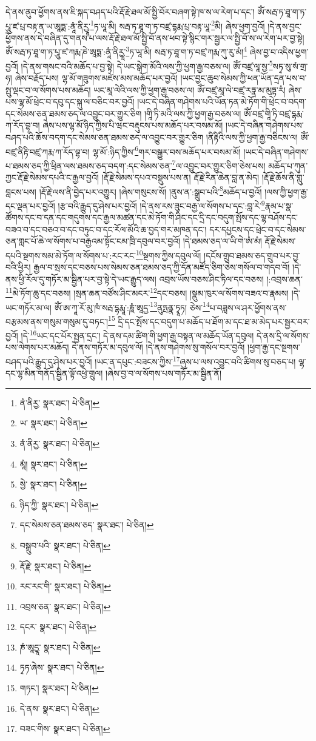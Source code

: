 དེ་ནས་ནུབ་ཕྱོགས་ནས་ཇི་སྐད་བཤད་པའི་རྡོ་རྗེ་ཐལ་མོ་སྤྱི་བོར་བཞག་སྟེ་ཁ་ས་ལ་རེག་པ་དང་། ཨོཾ་སརྦ་ཏ་ཐཱ་ག་ཏ་པཱུ་ཛ་པྲ་བརྟ་ན་ཡ་ཨཱཏྨ་:ནཱཾ་ནིརྱཱ་\footnote{ནཾ་ནིརྱ་  སྣར་ཐང་།  པེ་ཅིན། }ཏ་ཡཱ་མི། སརྦ་ཏ་ཐཱ་ག་ཏ་བཛྲ་དྷརྨ་པྲ་བརྟ་ཡཱ་\footnote{ཡ་  སྣར་ཐང་།  པེ་ཅིན། }མི། ཞེས་ཕྱག་བྱའོ། །དེ་ནས་བྱང་ཕྱོགས་ནས་དེ་བཞིན་དུ་གནས་པ་ལས་རྡོ་རྗེ་ཐལ་མོ་སྤྱི་བོ་ནས་ཕབ་སྟེ་སྙིང་གར་སྦྱར་ལ་སྤྱི་བོ་ས་ལ་རེག་པར་བྱ་སྟེ། ཨོཾ་སརྦ་ཏ་ཐཱ་ག་ཏ་པཱུ་ཛ་ཀརྨ་ཎེ་ཨཱཏྨ་:ནཱཾ་ནིརྱཱ་\footnote{ནཾ་ནིརྱ་  སྣར་ཐང་།  པེ་ཅིན། }ཏ་ཡཱ་མི། སརྦ་ཏ་ཐཱ་ག་ཏ་བཛྲ་ཀརྨ་ཀུ་རུ་མཾ།\footnote{མཱཾ།  སྣར་ཐང་།  པེ་ཅིན། } ཞེས་བྱ་བ་འདིས་ཕྱག་བྱའོ། །དེ་ནས་གསང་བའི་མཆོད་པ་བྱ་སྟེ། དེ་ཡང་སྒེག་མོའི་ལས་ཀྱི་ཕྱག་རྒྱ་བཅས་ལ། ཨོཾ་བཛྲ་ལཱ་སྱ་\footnote{སྱེ་  སྣར་ཐང་།  པེ་ཅིན། }སཏྭ་སུ་སཾ་གྲ་ཧ། ཞེས་བརྗོད་པས། ལྷ་མོ་གཟུགས་མཛེས་མས་མཆོད་པར་བྱའོ། །ཡང་བྱང་ཆུབ་སེམས་ཀྱི་ཕན་ཡོན་དྲན་པས་བ་སྤུ་ལྡང་བ་ལ་སོགས་པས་མཆོད། ཡང་མཱ་ལེའི་ལས་ཀྱི་ཕྱག་རྒྱ་བཅས་ལ། ཨོཾ་བཛྲ་མཱ་ལེ་བཛྲ་རཏྣ་མ་མུཏྟ་རཾ། ཞེས་པས་ལྷ་མོ་ཕྲེང་བ་དབུ་དང་སྐུ་ལ་བཅིང་བར་བྱའོ། །ཡང་དེ་བཞིན་གཤེགས་པའི་ཡོན་ཏན་མེ་ཏོག་གི་ཕྲེང་བ་བདག་དང་སེམས་ཅན་ཐམས་ཅད་ལ་འབྱུང་བར་གྱུར་ཅིག །གཱི་ཏི་མའི་ལས་ཀྱི་ཕྱག་རྒྱ་བཅས་ལ། ཨོཾ་བཛྲ་གཱི་ཏི་བཛྲ་དྷརྨ་ཀ་རོད་བྷ་བ། ཞེས་པས་ལྷ་མོ་ཉིད་ཀྱིས་པི་ཝང་བརྡུངས་པས་མཆོད་པར་བསམ་མོ། །ཡང་དེ་བཞིན་གཤེགས་པས་བཤད་པའི་ཆོས་བདག་དང་སེམས་ཅན་ཐམས་ཅད་ལ་འབྱུང་བར་གྱུར་ཅིག །ནིརྟིའི་ལས་ཀྱི་ཕྱག་རྒྱ་བཅིངས་ལ། ཨོཾ་བཛྲ་ནིརྟི་བཛྲ་ཀརྨ་ཀ་རོད་བྷ་བ། ལྷ་མོ་:ཉིད་ཀྱིས་\footnote{ཉིད་ཀྱི་  སྣར་ཐང་།  པེ་ཅིན། }གར་བསྒྱུར་བས་མཆོད་པར་བསམ་མོ། །ཡང་དེ་བཞིན་གཤེགས་པ་ཐམས་ཅད་ཀྱི་ཕྲིན་ལས་ཐམས་ཅད་བདག་:དང་སེམས་ཅན་\footnote{དང་སེམས་ཅན་ཐམས་ཅད་  སྣར་ཐང་།  པེ་ཅིན། }ལ་འབྱུང་བར་གྱུར་ཅིག་ཅེས་པས། མཆོད་པ་ཀུན་ཀྱང་རྡོ་རྗེ་སེམས་དཔའི་ང་རྒྱལ་བྱའོ། །རྡོ་རྗེ་སེམས་དཔའ་བསྡུས་པས་ན། རྡོ་རྗེ་རིན་ཆེན་བླ་ན་མེད། །རྡོ་རྗེ་ཆོས་ནི་གླུ་བླངས་པས། །རྡོ་རྗེ་ལས་ནི་བྱེད་པར་འགྱུར། །ཞེས་གསུངས་སོ། །ནུས་ན་:སྒྲུབ་པའི་\footnote{བསྒྲུབ་པའི་  སྣར་ཐང་།  པེ་ཅིན། }མཆོད་པ་བྱའོ། །ལས་ཀྱི་ཕྱག་རྒྱ་དང་ལྡན་པར་བྱའོ། །རྩ་བའི་རྒྱུད་དུ་ཤེས་པར་བྱའོ། །དེ་ནས་རས་ཟུང་བརྒྱ་ལ་སོགས་པ་དང་:བླ་རེ་\footnote{རྡོ་རྗེ་  སྣར་ཐང་།  པེ་ཅིན། }རྣམ་པ་སྣ་ཚོགས་དང་བ་དན་དང་གདུགས་དང་རྒྱལ་མཚན་དང་མེ་ཏོག་གི་ཤིང་དང་དྲི་དང་བདུག་སྤོས་དང་ལྷ་བཤོས་དང་བཟའ་བ་དང་བཅའ་བ་དང་བཏུང་བ་དང་རོལ་མོའི་ཆ་བྱད་གར་མཁན་དང་། དར་དཔྱངས་དང་ཕྲེང་བ་དང་སེམས་ཅན་གླང་པོ་ཆེ་ལ་སོགས་པ་བརྒྱའམ་སྟོང་ངམ་ཁྲི་དབུལ་བར་བྱའོ། །དེ་ཐམས་ཅད་ལ་ཡི་གེ་ཨཾ་མཾ། རྡོ་རྗེ་སེམས་དཔའི་སྔགས་སམ་མེ་ཏོག་ལ་སོགས་པ་:རང་རང་\footnote{རང་རང་གི་  སྣར་ཐང་།  པེ་ཅིན། }སྔགས་ཀྱིས་དབུལ་ལོ། །དངོས་གྲུབ་ཐམས་ཅད་གྲུབ་པར་བྱ་བའི་ཕྱིར། རྒྱལ་བ་སྲས་དང་བཅས་པས་སེམས་ཅན་ཐམས་ཅད་ཀྱི་དོན་མཛོད་ཅིག་ཅེས་གསོལ་བ་གདབ་བོ། །དེ་ནས་ཕྱི་རོལ་དུ་གཏོར་མ་སྦྱིན་པར་བྱ་སྟེ་དེ་ཡང་རྒྱུད་ལས། འབྲས་ཡོས་བཅས་ཤིང་ཏིལ་དང་བཅས། །:འབྲས་ཆན་\footnote{འབྲས་ཅན་  སྣར་ཐང་།  པེ་ཅིན། }མེ་ཏོག་ཆུ་དང་བཅས། །སྲན་ཆན་བཙོས་ཤིང་མངར་\footnote{དངར་  སྣར་ཐང་།  པེ་ཅིན། }དང་བཅས། །སྣུམ་ཁུར་ལ་སོགས་བཟའ་བ་རྣམས། །དེ་ཡང་གཏོར་མ་ལ། ཨོཾ་ཨ་ཀཱ་རོ་མུ་ཁཾ་སརྦ་དྷརྨཱ་:ཎཱཾ་ཨཱདྱ་\footnote{ཎཾ་ཨཱདྱཱ་  སྣར་ཐང་།  པེ་ཅིན། }ནུཏྤནྣ་ཏྭཱཏ། ཅེས་\footnote{ཏྭཏ་ཞེས་  སྣར་ཐང་།  པེ་ཅིན། }པ་བཟླས་ལ་ཤར་ཕྱོགས་ནས་བརྩམས་ནས་གསུམ་གསུམ་དུ་བཏང་།\footnote{གཏང་།  སྣར་ཐང་།  པེ་ཅིན། } དྲི་དང་སྤོས་དང་བདུག་པ་མཆོད་པ་ཐོག་མ་དང་ཐ་མ་མེད་པར་སྦྱར་བར་བྱའོ། །དེ་\footnote{དེ་ནས་  སྣར་ཐང་།  པེ་ཅིན། }ཡང་དང་པོར་སྤྱན་དྲང་། དེ་ནས་དམ་ཚིག་གི་ཕྱག་རྒྱ་བསྟན་ལ་མཆོད་ཡོན་དབུལ། དེ་ནས་དྲི་ལ་སོགས་པས་ལེགས་པར་མཆོད། དེ་ནས་གཏོར་མ་དབུལ་ལོ། །དེ་ནས་གཤེགས་སུ་གསོལ་བར་བྱའོ། །ཕྱག་རྒྱ་དང་སྔགས་བཤད་པའི་རྒྱུད་དུ་ཤེས་པར་བྱའོ། །ཡང་ན་དཔུང་:བཟངས་ཀྱིས་\footnote{བཟང་གིས་  སྣར་ཐང་།  པེ་ཅིན། }ཞུས་པ་ལས་འབྱུང་བའི་ཚིགས་སུ་བཅད་པ། ལྷ་དང་ལྷ་མིན་གནོད་སྦྱིན་ལྟོ་འཕྱེ་གྲུལ། །ཞེས་བྱ་བ་ལ་སོགས་པས་གཏོར་མ་སྦྱིན་ནོ། 
